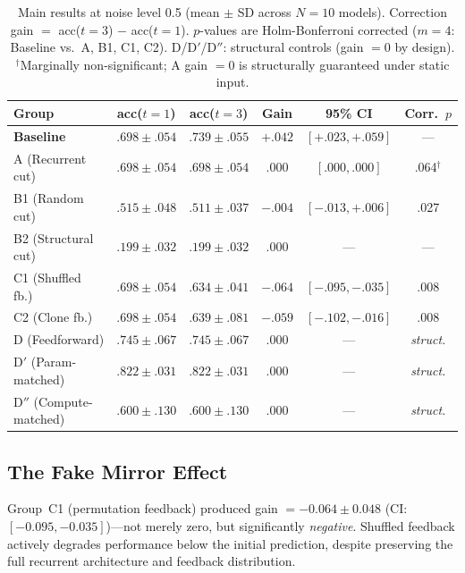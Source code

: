 \documentclass[10pt]{article}
\begin{document}
\begin{table}[t]
\caption{Main results at noise level 0.5 (mean $\pm$ SD across $N{=}10$ models). Correction gain $=$ acc($t{=}3$) $-$ acc($t{=}1$). $p$-values are Holm-Bonferroni corrected ($m{=}4$: Baseline vs.\ A, B1, C1, C2). D/D$'$/D$''$: structural controls (gain $= 0$ by design). $^\dagger$Marginally non-significant; A gain $= 0$ is structurally guaranteed under static input.}
\label{tab:main}
\centering
\begin{tabular}{@{}lccccc@{}}
\toprule
Group & acc($t{=}1$) & acc($t{=}3$) & Gain & 95\% CI & Corr.\ $p$ \\
\midrule
\textbf{Baseline}   & $.698 \pm .054$ & $.739 \pm .055$ & $\mathbf{+.042}$ & $[+.023, +.059]$ & --- \\
A (Recurrent cut)    & $.698 \pm .054$ & $.698 \pm .054$ & $.000$           & $[.000, .000]$   & .064$^\dagger$ \\
B1 (Random cut)      & $.515 \pm .048$ & $.511 \pm .037$ & $-.004$          & $[-.013, +.006]$ & .027 \\
B2 (Structural cut)  & $.199 \pm .032$ & $.199 \pm .032$ & $.000$           & ---              & --- \\
C1 (Shuffled fb.)    & $.698 \pm .054$ & $.634 \pm .041$ & $\mathbf{-.064}$ & $[-.095, -.035]$ & .008 \\
C2 (Clone fb.)       & $.698 \pm .054$ & $.639 \pm .081$ & $\mathbf{-.059}$ & $[-.102, -.016]$ & .008 \\
D (Feedforward)      & $.745 \pm .067$ & $.745 \pm .067$ & $.000$           & ---              & \emph{struct.} \\
D$'$ (Param-matched) & $.822 \pm .031$ & $.822 \pm .031$ & $.000$           & ---              & \emph{struct.} \\
D$''$ (Compute-matched) & $.600 \pm .130$ & $.600 \pm .130$ & $.000$ & --- & \emph{struct.} \\
\bottomrule
\end{tabular}
\end{table}

\subsection{The Fake Mirror Effect}

Group~C1 (permutation feedback) produced gain $= -0.064 \pm 0.048$ (CI: $[-0.095, -0.035]$)---not merely zero, but significantly \emph{negative}. Shuffled feedback actively degrades performance below the initial prediction, despite preserving the full recurrent architecture and feedback distribution.
\end{document}
